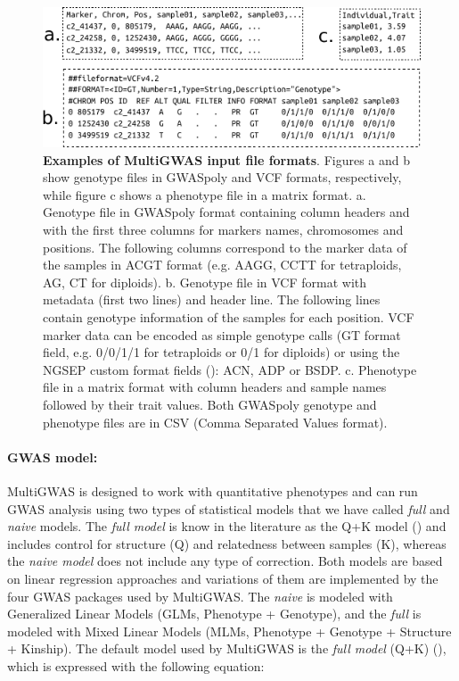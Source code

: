 \documentclass{article}
\begin{document}
\begin{figure}[H]
\begin{centering}
\includegraphics{images/paper-input-files}
\par\end{centering}
\caption{\scriptsize \textbf{{Examples of MultiGWAS input file formats}}. Figures a and b show genotype files in GWASpoly and VCF formats, respectively, while figure c shows a phenotype file in a matrix format. a. Genotype file in GWASpoly format containing column headers and with the first three columns for markers names, chromosomes and positions. The following columns correspond to the marker data of the samples in \textquotedbl{}ACGT\textquotedbl{} format (e.g. AAGG, CCTT for tetraploids, AG, CT for diploids). b. Genotype file in VCF format with metadata (first two lines) and header line. The following lines contain genotype information of the samples for each position. VCF marker data can be encoded as simple genotype calls (GT format field, e.g. 0/0/1/1 for tetraploids or 0/1 for diploids) or using the NGSEP custom format fields (\cite{Duitama2019}): ACN, ADP or BSDP. c. Phenotype file in a matrix format with column headers and sample names followed by their trait values. Both GWASpoly genotype and phenotype files are in CSV (Comma Separated Values format).} \label{fig:File-Formats}\protect 
\end{figure}


\paragraph{GWAS model:}

MultiGWAS is designed to work with quantitative phenotypes and can run GWAS analysis using two types of statistical models that we have called \emph{full} and \emph{naive} models. The \emph{full model} is know in the literature as the Q+K model (\cite{Yu2006}) and includes control for structure (Q) and relatedness between samples (K), whereas the \emph{naive model} does not include any type of correction. Both models are based on linear regression approaches and variations of them are implemented by the four GWAS packages used by MultiGWAS. The \emph{naive} is modeled with Generalized Linear Models (GLMs, Phenotype + Genotype), and the \emph{full} is modeled with Mixed Linear Models (MLMs, Phenotype + Genotype + Structure + Kinship). The default model used by MultiGWAS is the \emph{full model} (Q+K) (\cite{Yu2006}), which is expressed with the following equation:
\end{document}
